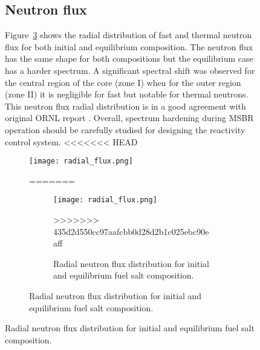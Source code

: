 \begin{figure}[htp!]
\subsection{Neutron flux}
Figure~\ref{fig:radial_flux} shows the radial distribution of fast and thermal 
neutron flux for both initial and equilibrium composition. The neutron flux has 
the same shape for both compositions but the equilibrium case has a harder 
spectrum. A significant spectral shift was observed for the central region of 
the core (zone I) when for the outer region (zone II) it is negligible for fast 
but notable for thermal neutrons. This neutron flux radial distribution is in a 
good agreement with original ORNL report \cite{robertson_conceptual_1971}. 
Overall, spectrum hardening during \gls{MSBR} operation should be carefully 
studied for designing the reactivity control system.
<<<<<<< HEAD
\begin{figure}[ht!] %
  \centering
  \texttt{[image: radial\_flux.png]} 
  \caption{Radial neutron flux distribution for initial and equilibrium fuel 
salt composition.}
=======
\begin{figure}[ht!] %
  \texttt{[image: radial\_flux.png]} \caption{Radial neutron 
  flux distribution for initial and equilibrium fuel salt composition.}
>>>>>>> 435d2d550cc97aafcbb0d28d2b1c025ebc90eaff
  \label{fig:radial_flux}
\end{figure}


\end{figure}
\end{figure}
